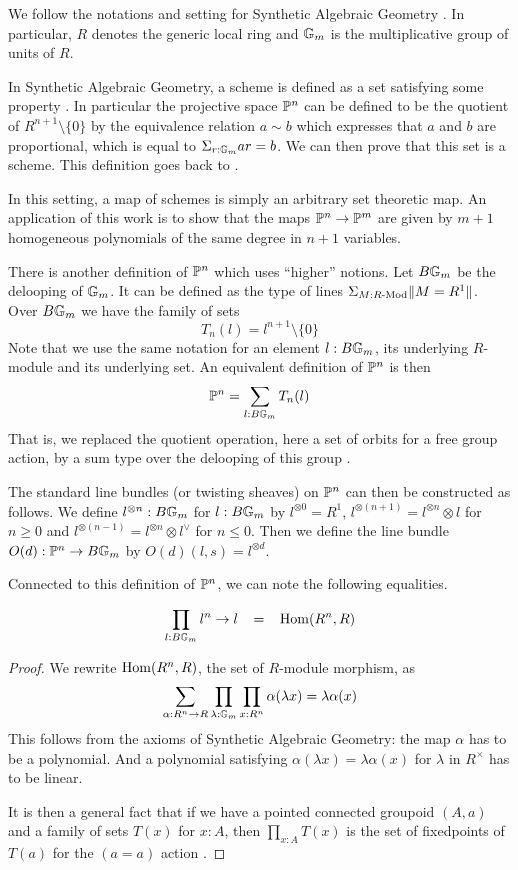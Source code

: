 We follow the notations and setting for Synthetic Algebraic Geometry \cite{draft}.
In particular, $R$ denotes the generic local ring and $\mathbb{G}_m$ is the multiplicative group of units of $R$.

In Synthetic Algebraic Geometry, a scheme is defined as a set satisfying some property \cite{draft}. In particular
the projective space $\mathbb{P}^n$ can be defined to be the quotient of $R^{n+1}\setminus\{0\}$ by the
equivalence relation $a\sim b$ which expresses that $a$ and $b$ are proportional, %
which is equal to $\Sigma_{r:\mathbb{G}_m}ar = b$. We can then prove \cite{draft}
that this set is a scheme. This definition goes back to \cite{Kock74}.

 In this setting, a map of schemes is simply an arbitrary set theoretic map. An application of this work is to show
 that the maps $\mathbb{P}^n\rightarrow \mathbb{P}^m$ are given by $m+1$ homogeneous polynomials of the same degree in $n+1$ variables.

\medskip


There is another definition of $\mathbb{P}^n$ which uses ``higher'' notions. Let $B\mathbb{G}_m$ be the delooping
of $\mathbb{G}_m$. It can be defined as the type of lines $\Sigma_{M:R\text{-}\mathrm{Mod}}\|{M=R^1}\|$. Over $B\mathbb{G}_m$ we have the
family of sets
$$T_n(l) = l^{n+1}\setminus\{0\}$$
Note that we use the same notation for an element $l : B\mathbb{G}_m$,
its underlying $R$-module and its underlying set.
An equivalent definition of $\mathbb{P}^n$ is then
$$
\mathbb{P}^n = \sum_{l:B\mathbb{G}_m}T_n(l)
$$
That is, we replaced the quotient operation, here a set of orbits for a free group action, by a sum type over the delooping of this group
\cite{Sym}.

The standard line bundles (or twisting sheaves) on $\mathbb{P}^n$ can then be constructed as follows.
We define $l^{\otimes n}:B\mathbb{G}_m$ for $l:B\mathbb{G}_m$ by
$l^{\otimes 0} = R^1$,
$l^{\otimes (n+1)} = l^{\otimes n}\otimes l$ for $n \geqslant 0$
and $l^{\otimes (n-1)} = l^{\otimes n}\otimes l^{\vee}$ for $n \leqslant 0$.
Then we define the line bundle $O(d):\mathbb{P}^n\rightarrow B\mathbb{G}_m$ by $O(d)(l,s) = l^{\otimes d}$.

\medskip

 Connected to this definition of $\mathbb{P}^n$, we can note the following equalities.

\begin{proposition}\label{end}
  $$\prod_{l:B\mathbb{G}_m}l^n\rightarrow l \;\;\;=\;\;\; \mathrm{Hom}(R^n,R)$$
\end{proposition}

\begin{proof}
We rewrite $\mathrm{Hom}(R^n,R)$, the set of $R$-module morphism, as
$$
\sum_{\alpha:R^n\rightarrow R}\prod_{\lambda:\mathbb{G}_m}\prod_{x:R^n}\alpha(\lambda x) = \lambda \alpha(x)
$$
This follows from the axioms of Synthetic Algebraic Geometry: the map $\alpha$ has to be a polynomial. And a polynomial
satisfying $\alpha(\lambda x) = \lambda \alpha(x)$ for $\lambda$ in $R^{\times}$ has to be linear.

\medskip

It is then a general fact that if we have a pointed connected groupoid $(A,a)$ and a family of
sets $T(x)$ for $x:A$, then $\prod_{x:A}T(x)$ is the set of fixedpoints of $T(a)$ for the $(a=a)$ action
\cite{Sym}.
\end{proof}

